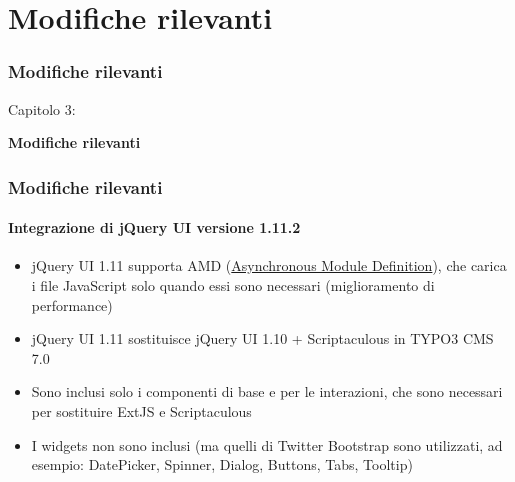 %

\section{Modifiche rilevanti}
\begin{frame}[fragile]
	\frametitle{Modifiche rilevanti}

	\begin{center}\huge{Capitolo 3:}\end{center}
	\begin{center}\huge{\color{typo3darkgrey}\textbf{Modifiche rilevanti}}\end{center}

\end{frame}


\begin{frame}[fragile]
	\frametitle{Modifiche rilevanti}
	\framesubtitle{Integrazione di jQuery UI versione 1.11.2}

	\begin{itemize}
		\item jQuery UI 1.11 supporta AMD
			(\href{http://en.wikipedia.org/wiki/Asynchronous_module_definition}{Asynchronous Module Definition}),
			che carica i file JavaScript solo quando essi sono necessari (miglioramento di performance)

    	\item jQuery UI 1.11 sostituisce jQuery UI 1.10 + Scriptaculous in TYPO3 CMS 7.0

    	\item Sono inclusi solo i componenti di base e per le interazioni, che sono necessari
    		per sostituire ExtJS e Scriptaculous

    	\item I widgets non sono inclusi (ma quelli di Twitter Bootstrap sono utilizzati,
    		ad esempio: DatePicker, Spinner, Dialog, Buttons, Tabs, Tooltip)

	\end{itemize}

\end{frame}


